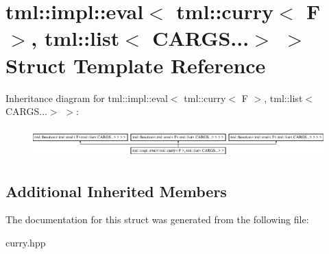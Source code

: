 \hypertarget{structtml_1_1impl_1_1eval_3_01tml_1_1curry_3_01F_01_4_00_01tml_1_1list_3_01CARGS_8_8_8_4_01_4}{\section{tml\+:\+:impl\+:\+:eval$<$ tml\+:\+:curry$<$ F $>$, tml\+:\+:list$<$ C\+A\+R\+G\+S...$>$ $>$ Struct Template Reference}
\label{structtml_1_1impl_1_1eval_3_01tml_1_1curry_3_01F_01_4_00_01tml_1_1list_3_01CARGS_8_8_8_4_01_4}
}
Inheritance diagram for tml\+:\+:impl\+:\+:eval$<$ tml\+:\+:curry$<$ F $>$, tml\+:\+:list$<$ C\+A\+R\+G\+S...$>$ $>$\+:\begin{figure}[H]
\begin{center}
\leavevmode
\includegraphics[height=1.163032cm]{structtml_1_1impl_1_1eval_3_01tml_1_1curry_3_01F_01_4_00_01tml_1_1list_3_01CARGS_8_8_8_4_01_4}
\end{center}
\end{figure}
\subsection*{Additional Inherited Members}


The documentation for this struct was generated from the following file\+:\begin{DoxyCompactItemize}
\item 
curry.\+hpp\end{DoxyCompactItemize}
